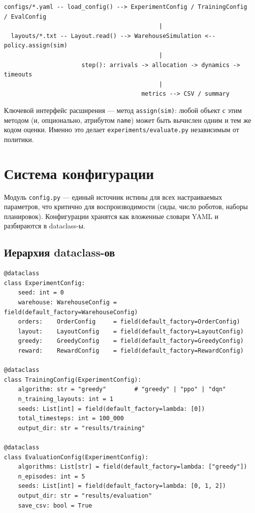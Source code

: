 \documentclass[11pt,a4paper]{article}
\newcommand{\code}[1]{\texttt{#1}}
\begin{document}
\begin{lstlisting}[style=tree]
  configs/*.yaml -- load_config() --> ExperimentConfig / TrainingConfig / EvalConfig
                                            |
  layouts/*.txt -- Layout.read() --> WarehouseSimulation <-- policy.assign(sim)
                                            |
                      step(): arrivals -> allocation -> dynamics -> timeouts
                                            |
                                       metrics --> CSV / summary
\end{lstlisting}

Ключевой интерфейс расширения — метод \code{assign(sim)}: любой объект с этим
методом (и, опционально, атрибутом \code{name}) может быть вычислен одним и тем
же кодом оценки. Именно это делает \code{experiments/evaluate.py} независимым от
политики.

\section{Система конфигурации}
Модуль \code{config.py} — единый источник истины для всех настраиваемых
параметров, что критично для воспроизводимости (сиды, число роботов, наборы
планировок). Конфигурации хранятся как вложенные словари YAML и разбираются в
dataclass-ы.

\subsection{Иерархия dataclass-ов}
\begin{lstlisting}[style=py]
@dataclass
class ExperimentConfig:
    seed: int = 0
    warehouse: WarehouseConfig = field(default_factory=WarehouseConfig)
    orders:    OrderConfig     = field(default_factory=OrderConfig)
    layout:    LayoutConfig    = field(default_factory=LayoutConfig)
    greedy:    GreedyConfig    = field(default_factory=GreedyConfig)
    reward:    RewardConfig    = field(default_factory=RewardConfig)

@dataclass
class TrainingConfig(ExperimentConfig):
    algorithm: str = "greedy"        # "greedy" | "ppo" | "dqn"
    n_training_layouts: int = 1
    seeds: List[int] = field(default_factory=lambda: [0])
    total_timesteps: int = 100_000
    output_dir: str = "results/training"

@dataclass
class EvaluationConfig(ExperimentConfig):
    algorithms: List[str] = field(default_factory=lambda: ["greedy"])
    n_episodes: int = 5
    seeds: List[int] = field(default_factory=lambda: [0, 1, 2])
    output_dir: str = "results/evaluation"
    save_csv: bool = True
\end{lstlisting}
\end{document}
